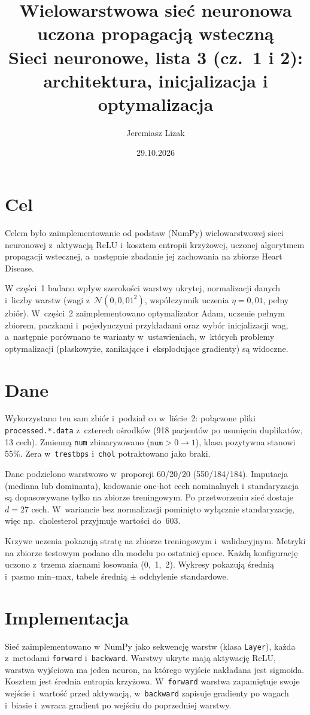 \documentclass[11pt,a4paper]{article}
\title{Wielowarstwowa sieć neuronowa uczona propagacją wsteczną\\[0.3em]
  \large Sieci neuronowe, lista 3 (cz.~1 i 2): architektura, inicjalizacja i optymalizacja}
\author{Jeremiasz Lizak}
\date{29.10.2026}
\begin{document}
\maketitle

\section{Cel}
Celem było zaimplementowanie od podstaw (NumPy) wielowarstwowej sieci neuronowej z~aktywacją
ReLU i~kosztem entropii krzyżowej, uczonej algorytmem propagacji wstecznej, a~następnie
zbadanie jej zachowania na zbiorze Heart Disease.

W części~1 badano wpływ szerokości warstwy ukrytej, normalizacji danych i~liczby warstw
(wagi z~$\mathcal{N}(0, 0{,}01^2)$, współczynnik uczenia $\eta = 0{,}01$, pełny zbiór).
W~części~2 zaimplementowano optymalizator Adam, uczenie pełnym zbiorem, paczkami i~pojedynczymi
przykładami oraz wybór inicjalizacji wag, a~następnie porównano te warianty w~ustawieniach,
w~których problemy optymalizacji (płaskowyże, zanikające i~eksplodujące gradienty) są widoczne.

\section{Dane}
Wykorzystano ten sam zbiór i~podział co w~liście~2: połączone pliki \texttt{processed.*.data}
z~czterech ośrodków (918 pacjentów po usunięciu duplikatów, 13 cech). Zmienną \texttt{num}
zbinaryzowano ($\texttt{num} > 0 \to 1$), klasa pozytywna stanowi 55\%. Zera w~\texttt{trestbps}
i~\texttt{chol} potraktowano jako braki.

Dane podzielono warstwowo w~proporcji 60/20/20 (550/184/184). Imputacja (mediana lub dominanta),
kodowanie one-hot cech nominalnych i~standaryzacja są dopasowywane tylko na zbiorze treningowym.
Po przetworzeniu sieć dostaje $d = 27$ cech. W~wariancie bez normalizacji pominięto wyłącznie
standaryzację, więc np.\ cholesterol przyjmuje wartości do~603.

Krzywe uczenia pokazują stratę na zbiorze treningowym i~walidacyjnym. Metryki na zbiorze testowym
podano dla modelu po ostatniej epoce. Każdą konfigurację uczono z~trzema ziarnami losowania
(0,~1,~2). Wykresy pokazują średnią i~pasmo min--max, tabele średnią $\pm$ odchylenie standardowe.

\section{Implementacja}
Sieć zaimplementowano w~NumPy jako sekwencję warstw (klasa \texttt{Layer}), każda z~metodami
\texttt{forward} i~\texttt{backward}. Warstwy ukryte mają aktywację ReLU, warstwa wyjściowa ma
jeden neuron, na którego wyjście nakładana jest sigmoida. Kosztem jest średnia entropia krzyżowa.
W~\texttt{forward} warstwa zapamiętuje swoje wejście i~wartość przed aktywacją, w~\texttt{backward}
zapisuje gradienty po wagach i~biasie i~zwraca gradient po wejściu do poprzedniej warstwy.
\end{document}
